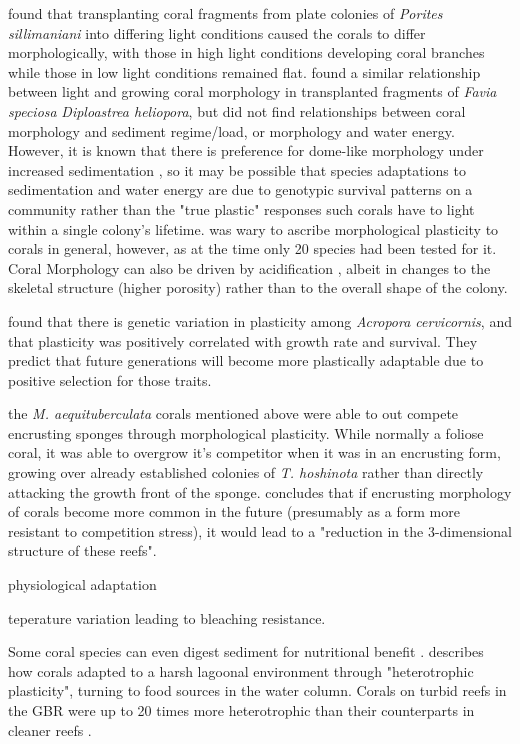 \documentclass[11pt,a4paper]{article}
\begin{document}
\cite{Muko2000} found that transplanting coral fragments from plate colonies of \textit{Porites sillimaniani} into differing light conditions caused the corals to differ morphologically, with those in high light conditions developing coral branches while those in low light conditions remained flat.
 \cite{Todd2004} found a similar relationship between light and growing coral morphology in transplanted fragments of \textit{Favia speciosa} \textit{Diploastrea heliopora}, but did not find relationships between coral morphology and sediment regime/load, or morphology and water energy.
  However, it is known that there is preference for dome-like morphology under increased sedimentation \citep{Stafford1992}, so it may be possible that species adaptations to sedimentation and water energy are due to genotypic survival patterns on a community rather than the "true plastic" responses such corals have to light within a single colony's lifetime.
   \cite{Todd2008} was wary to ascribe morphological plasticity to corals in general, however, as at the time only 20 species had been tested for it. Coral Morphology can also be driven by acidification \citep{Tambutte2015,Alison2022}, albeit in changes to the skeletal structure (higher porosity) rather than to the overall shape of the colony.

\cite{Million} found that there is genetic variation in plasticity among \textit{Acropora cervicornis}, and that plasticity was positively correlated with growth rate and survival. They predict that future generations will become more plastically adaptable due to positive selection for those traits. 

the \textit{M. aequituberculata} corals mentioned above \citep{Elliot2016} were able to out compete encrusting sponges through morphological plasticity. While normally a foliose coral, it was able to overgrow it's competitor when it was in an encrusting form, growing over already established colonies of \textit{T. hoshinota} rather than directly attacking the growth front of the sponge. \cite{Elliot2016} concludes that if encrusting morphology of corals become more common in the future (presumably as a form more resistant to competition stress), it would lead to a "reduction in the 3-dimensional structure of these reefs".

\cite{Hennige2008} physiological adaptation

\cite{Safaie2018} teperature variation leading to bleaching resistance.



Some coral species can even digest sediment for nutritional benefit \citep{Rosenfeld1999}. \cite{Camp2017} describes how corals  adapted to a harsh lagoonal environment through "heterotrophic plasticity", turning to food sources in the water column. Corals on turbid reefs in the GBR were up to 20 times more heterotrophic than their counterparts in cleaner reefs \citep{Anthony2000}.
\end{document}
